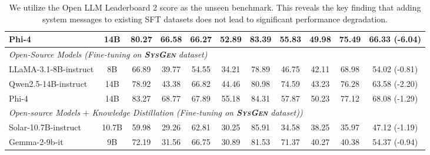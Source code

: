 \begin{table*}[t]
{{\begin{tabular}{lcccccccccc}
Phi-4 & 14B & 80.27 & 66.58  & 66.27 & 52.89 & 83.39 & 55.83 & 49.98 & 75.49 & 66.33 (-6.04) \\ 
\midrule
\multicolumn{11}{l}{\textit{Open-Source Models (Fine-tuning on \textbf{\textsc{SysGen}} dataset)}} \\ \midrule 
LLaMA-3.1-8B-instruct & 8B & 66.89 & 39.77 & 54.55 & 34.21 & 78.89 & 46.75 & 42.11 & 68.98 & 54.02 (-0.81) \\ 
Qwen2.5-14B-instruct & 14B & 78.92 & 43.38 & 66.82 & 44.46 & 80.98 & 74.59 & 43.23 & 76.28 & 63.58 (-2.20) \\ 
Phi-4 & 14B & 83.27 & 68.77  & 67.89 & 55.18 & 84.31 & 57.87 & 50.23 & 77.12 & 68.08 (-1.29) \\ 
\midrule
\multicolumn{11}{l}{\textit{Open-source Models} $+$ \textit{Knowledge Distillation (Fine-tuning on \textbf{\textsc{SysGen}} dataset))}} \\
\midrule 
Solar-10.7B-instruct & 10.7B & 59.98  & 29.26  & 62.81 & 30.25 & 85.91 & 34.58 & 38.25 & 35.97 & 47.12 (-1.19) \\ 
Gemma-2-9b-it & 9B & 72.19 & 31.56 & 66.75 & 30.89 & 81.53 & 71.37 & 40.27 & 40.38 & 54.37 (-0.94) \\ 
\bottomrule
\end{tabular}}}
\caption{We utilize the Open LLM Leaderboard 2 score as the unseen benchmark. This reveals the key finding that adding system messages to existing SFT datasets does not lead to significant performance degradation.}
\label{tab:unseen_experiments}
\end{table*}